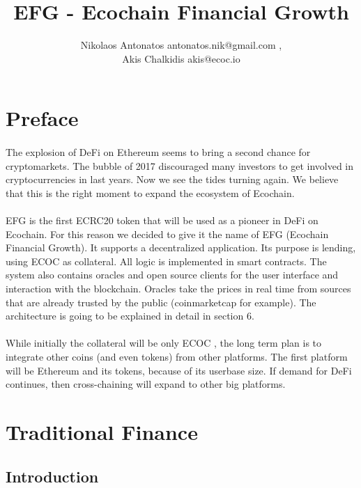 \documentclass{article}
\title{EFG - Ecochain Financial Growth}
\author{Nikolaos Antonatos antonatos.nik@gmail.com , \\
Akis Chalkidis akis@ecoc.io}
\begin{document}
\pagecolor{bg}
\maketitle
\tableofcontents
\newpage

\section{Preface}
\paragraph{ }
The explosion of DeFi on Ethereum seems to bring a second chance for cryptomarkets. The bubble of 2017 discouraged many investors to get involved in cryptocurrencies in  last years. Now we see the tides turning again. We believe that this is the right moment to expand the ecosystem of Ecochain.
\paragraph{ }
EFG is the first ECRC20 token that will be used as a pioneer in DeFi on Ecochain. For this reason we decided to give it the name of EFG (Ecochain Financial Growth). It supports a decentralized application. Its purpose is lending, using ECOC as collateral. All logic is implemented in smart contracts. The system also contains oracles and open source clients for the user interface and interaction with the blockchain. Oracles take the prices in real time from sources that are already trusted by the public (coinmarketcap for example). The architecture is going to be explained in detail in section 6.
\paragraph{ }
While initially the collateral will be only ECOC , the long term plan is to integrate other coins (and even tokens) from other platforms. The first platform will be Ethereum and its tokens, because of its userbase size. If demand for DeFi continues, then cross-chaining will expand to other big platforms.

\section{Traditional Finance}
\subsection{Introduction}
\end{document}
